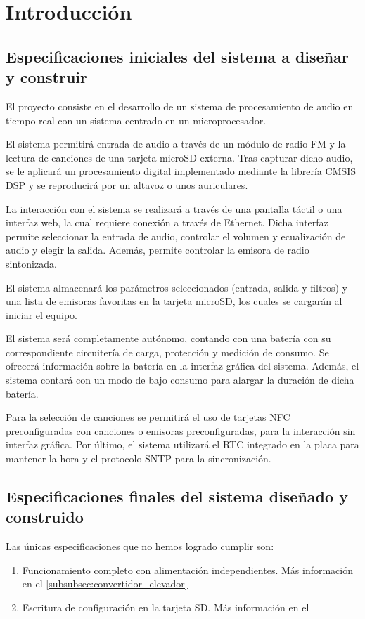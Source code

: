 \section{Introducción}

\subsection{Especificaciones iniciales del sistema a diseñar y construir}

El proyecto consiste en el desarrollo de un sistema de procesamiento de audio en tiempo real con un sistema centrado en un microprocesador.

El sistema permitirá entrada de audio a través de un módulo de radio FM y la lectura de canciones de una tarjeta microSD externa. Tras capturar dicho audio, se le aplicará un procesamiento digital implementado mediante la librería CMSIS DSP y se reproducirá por un altavoz o unos auriculares.

La interacción con el sistema se realizará a través de una pantalla táctil o una interfaz web, la cual requiere conexión a través de Ethernet. Dicha interfaz permite seleccionar la entrada de audio, controlar el volumen y ecualización de audio y elegir la salida. Además, permite controlar la emisora de radio sintonizada.

El sistema almacenará los parámetros seleccionados (entrada, salida y filtros) y una lista de emisoras favoritas en la tarjeta microSD, los cuales se cargarán al iniciar el equipo.

El sistema será completamente autónomo, contando con una batería con su correspondiente circuitería de carga, protección y medición de consumo. Se ofrecerá información sobre la batería en la interfaz gráfica del sistema. Además, el sistema contará con un modo de bajo consumo para alargar la duración de dicha batería.

Para la selección de canciones se permitirá el uso de tarjetas NFC preconfiguradas con canciones o emisoras preconfiguradas, para la interacción sin interfaz gráfica. Por último, el sistema utilizará el RTC integrado en la placa para mantener la hora y el protocolo SNTP para la sincronización.

\subsection{Especificaciones finales del sistema diseñado y construido}

Las únicas especificaciones que no hemos logrado cumplir son:
\begin{enumerate}
    \item Funcionamiento completo con alimentación independientes. Más información en el \autoref{subsubsec:convertidor_elevador}
    \item Escritura de configuración en la tarjeta SD. Más información en el 
\end{enumerate}